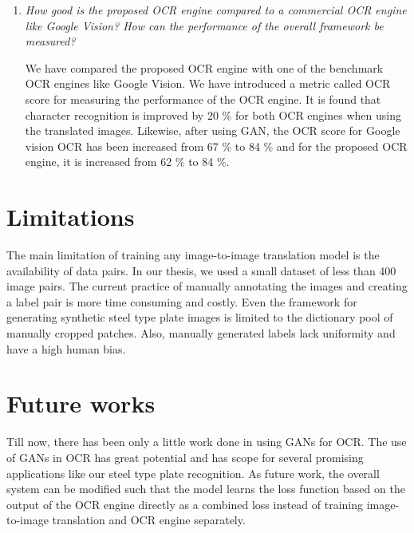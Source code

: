 \begin{enumerate}
\item \textit{How good is the proposed OCR engine compared to a commercial OCR engine like Google Vision? How can the performance of the overall framework be measured?}

We have compared the proposed OCR engine with one of the benchmark OCR engines like Google Vision. We have introduced a metric called OCR score for measuring the performance of the OCR engine. It is found that character recognition is improved by 20 \% for both OCR engines when using the translated images. Likewise, after using GAN, the OCR score for Google vision OCR has been increased from 67 \% to 84 \% and for the proposed OCR engine, it is increased from 62 \% to 84 \%.

\end{enumerate}

\section{Limitations}
The main limitation of training any image-to-image translation model is the availability of data pairs. In our thesis, we used a small dataset of less than 400 image pairs. The current practice of manually annotating the images and creating a label pair is more time consuming and costly. Even the framework for generating synthetic steel type plate images is limited to the dictionary pool of manually cropped patches. Also, manually generated labels lack uniformity and have a high human bias.   

\section{Future works}
	Till now, there has been only a little work done in using GANs for OCR. The use of GANs in OCR has great potential and has scope for several promising applications like our steel type plate recognition. As future work, the overall system can be modified such that the model learns the loss function based on the output of the OCR engine directly as a combined loss instead of training image-to-image translation and OCR engine separately.

